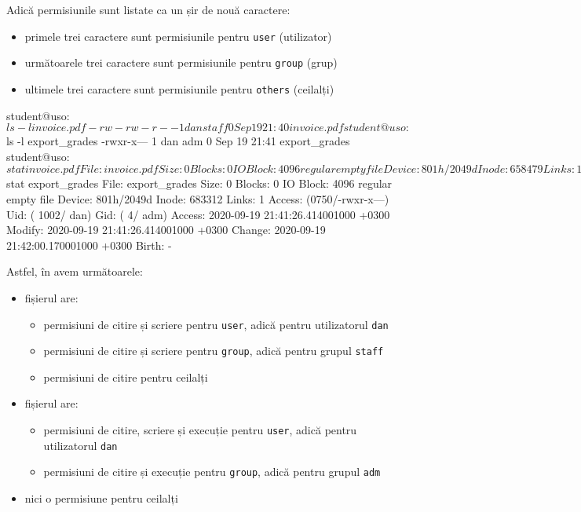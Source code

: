 Adică permisiunile sunt listate ca un șir de nouă caractere:

\begin{itemize}
  \item primele trei caractere sunt permisiunile pentru \texttt{user} (utilizator)
  \item următoarele trei caractere sunt permisiunile pentru \texttt{group} (grup)
  \item ultimele trei caractere sunt permisiunile pentru \texttt{others} (ceilalți)
\end{itemize}

\begin{screen}[caption={Listare permisiuni pe fișiere},label={lst:user:list-perm}]
student@uso:~$ ls -l invoice.pdf
-rw-rw-r-- 1 dan staff 0 Sep 19 21:40 invoice.pdf
student@uso:~$ ls -l export_grades
-rwxr-x--- 1 dan adm 0 Sep 19 21:41 export_grades
student@uso:~$ stat invoice.pdf
  File: invoice.pdf
  Size: 0         	Blocks: 0          IO Block: 4096   regular empty file
Device: 801h/2049d	Inode: 658479      Links: 1
Access: (0664/-rw-rw-r--)  Uid: ( 1002/     dan)   Gid: (   50/   staff)
Access: 2020-09-19 21:40:40.242001000 +0300
Modify: 2020-09-19 21:40:40.242001000 +0300
Change: 2020-09-19 21:41:55.110001000 +0300
 Birth: -
student@uso:~$ stat export_grades
  File: export_grades
  Size: 0         	Blocks: 0          IO Block: 4096   regular empty file
Device: 801h/2049d	Inode: 683312      Links: 1
Access: (0750/-rwxr-x---)  Uid: ( 1002/     dan)   Gid: (    4/     adm)
Access: 2020-09-19 21:41:26.414001000 +0300
Modify: 2020-09-19 21:41:26.414001000 +0300
Change: 2020-09-19 21:42:00.170001000 +0300
 Birth: -
\end{screen}

Astfel, în  avem următoarele:

\begin{itemize}
  \item fișierul  are:
	\begin{itemize}
          \item permisiuni de citire și scriere pentru \texttt{user}, adică pentru
                  utilizatorul \texttt{dan}
                \item permisiuni de citire și scriere pentru \texttt{group}, adică pentru
                  grupul \texttt{staff}
		\item permisiuni de citire pentru ceilalți
	\end{itemize}
  \item fișierul  are:
	\begin{itemize}
          \item permisiuni de citire, scriere și execuție pentru \texttt{user},
                  adică pentru utilizatorul \texttt{dan}
                \item permisiuni de citire și execuție pentru \texttt{group}, adică
                  pentru grupul \texttt{adm}
	\end{itemize}
	\item nici o permisiune pentru ceilalți
\end{itemize}

